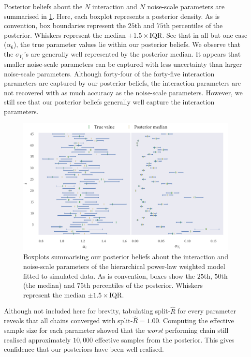 Posterior beliefs about the $N$ interaction and $N$ noise-scale parameters are
summarised in \cref{fig:power_hier_summary}. Here, each boxplot represents a
posterior density. As is convention, box boundaries represent the $25$th and
$75$th percentiles of the posterior. Whiskers represent the median
$\pm1.5\times\text{IQR}$. See that in all but one case ($\alpha_6$), the true
parameter values lie within our posterior beliefs. We observe that the
$\sigma_{Y_i}$'s are generally well represented by the posterior median. It
appears that smaller noise-scale parameters can be captured with less
uncertainty than larger noise-scale parameters. Although forty-four of the
forty-five interaction parameters are captured by our posterior beliefs, the
interaction parameters are not recovered with as much accuracy as the
noise-scale parameters. However, we still see that our posterior beliefs
generally well capture the interaction parameters. 

\begin{figure}[tbp]
  \includegraphics{power_hier_summary.pdf}
  \caption{Boxplots summarising our posterior beliefs about the interaction and
    noise-scale parameters of the hierarchical power-law weighted model
    fitted to simulated data. As is convention, boxes show the $25$th, $50$th
    (the median) and $75$th percentiles of the posterior. Whiskers represent
    the median $\pm 1.5\times\text{IQR}$.}
  \label{fig:power_hier_summary}
\end{figure}

Although not included here for brevity, tabulating split-$\widehat{R}$ for
every parameter reveals that all chains converged with
split-$\widehat{R}=1.00$. Computing the effective sample size for each
parameter showed that the \emph{worst} performing chain still realised
approximately $10,000$ effective samples from the posterior. This gives
confidence that our posteriors have been well realised.

